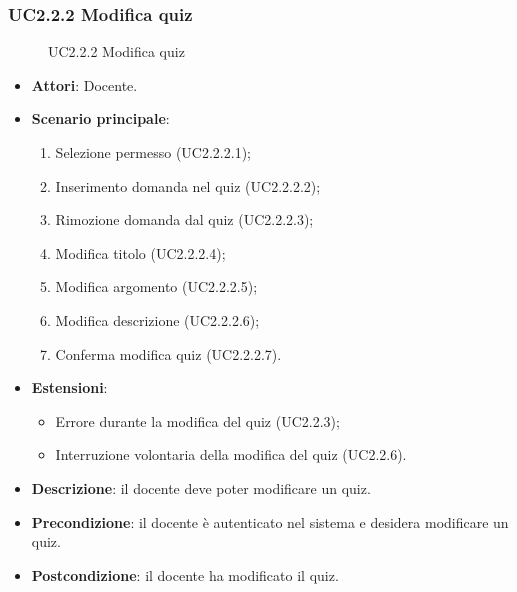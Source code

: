 \subsubsection{UC2.2.2 Modifica quiz}
\begin{figure}[H]
\centering
\noindent{}
\caption{UC2.2.2 Modifica quiz}
\end{figure}
\begin{itemize}
\item \textbf{Attori}: Docente.
\item \textbf{Scenario principale}:
\begin{enumerate}
\item Selezione permesso (UC2.2.2.1);
\item Inserimento domanda nel quiz (UC2.2.2.2);
\item Rimozione domanda dal quiz (UC2.2.2.3);
\item Modifica titolo (UC2.2.2.4);
\item Modifica argomento (UC2.2.2.5);
\item Modifica descrizione (UC2.2.2.6);
\item Conferma modifica quiz (UC2.2.2.7).
\end{enumerate}
\item \textbf{Estensioni}:
\begin{itemize}
\item Errore durante la modifica del quiz (UC2.2.3);
\item Interruzione volontaria della modifica del quiz (UC2.2.6).
\end{itemize}
\item \textbf{Descrizione}: il docente deve poter modificare un quiz.
\item \textbf{Precondizione}: il docente è autenticato nel sistema e desidera modificare un quiz.
\item \textbf{Postcondizione}: il docente ha modificato il quiz.
\end{itemize}
